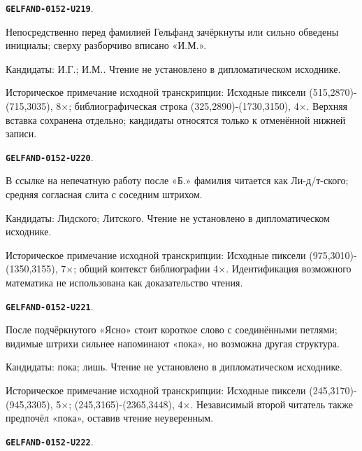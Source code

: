 \documentclass[11pt]{article}
\theoremstyle{definition}
\theoremstyle{remark}
\begin{document}
\par\noindent\leavevmode{}\label{GELFAND-0152-U219}\label{GELFAND-P001400:bibliography-cancelled-initials:note}\textbf{\texttt{GELFAND-0152-U219}}.\nopagebreak[4]\par
Непосредственно перед фамилией Гельфанд зачёркнуты или сильно обведены инициалы; сверху разборчиво вписано «И.М.».\par
Кандидаты: И.Г.; И.М.. Чтение не установлено в дипломатическом исходнике.\par
Историческое примечание исходной транскрипции: Исходные пиксели (515,2870)-(715,3035), 8×; библиографическая строка (325,2890)-(1730,3150), 4×. Верхняя вставка сохранена отдельно; кандидаты относятся только к отменённой нижней записи.\par\medskip
\par\noindent\leavevmode{}\label{GELFAND-0152-U220}\label{GELFAND-P001400:bibliography-last-name:note}\textbf{\texttt{GELFAND-0152-U220}}.\nopagebreak[4]\par
В ссылке на непечатную работу после «Б.» фамилия читается как Ли-д/т-ского; средняя согласная слита с соседним штрихом.\par
Кандидаты: Лидского; Литского. Чтение не установлено в дипломатическом исходнике.\par
Историческое примечание исходной транскрипции: Исходные пиксели (975,3010)-(1350,3155), 7×; общий контекст библиографии 4×. Идентификация возможного математика не использована как доказательство чтения.\par\medskip
\par\noindent\leavevmode{}\label{GELFAND-0152-U221}\label{GELFAND-P001400:penultimate-word:note}\textbf{\texttt{GELFAND-0152-U221}}.\nopagebreak[4]\par
После подчёркнутого «Ясно» стоит короткое слово с соединёнными петлями; видимые штрихи сильнее напоминают «пока», но возможна другая структура.\par
Кандидаты: пока; лишь. Чтение не установлено в дипломатическом исходнике.\par
Историческое примечание исходной транскрипции: Исходные пиксели (245,3170)-(945,3305), 5×; (245,3165)-(2365,3448), 4×. Независимый второй читатель также предпочёл «пока», оставив чтение неуверенным.\par\medskip
\par\noindent\leavevmode{}\label{GELFAND-0152-U222}\label{GELFAND-P001400:cancelled-before-integers:note}\textbf{\texttt{GELFAND-0152-U222}}.\nopagebreak[4]\par
\end{document}
